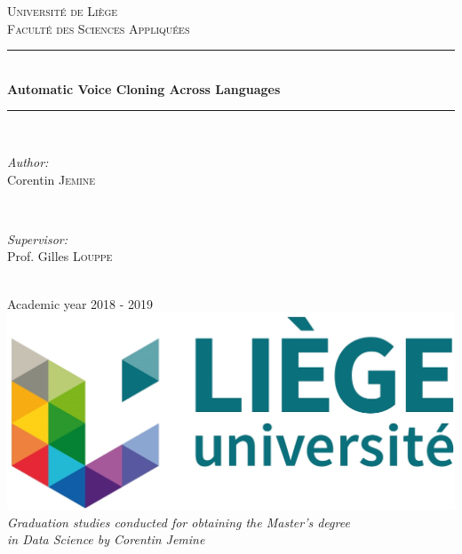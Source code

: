 \documentclass[a4paper, oneside]{article}
\begin{document}
\begin{titlepage}
	\newcommand{\HRule}{\rule{\linewidth}{0.5mm}}
	\center
	\textsc{\LARGE Université de Liège}\\[1cm]
	\textsc{\Large Faculté des Sciences Appliquées}\\[2cm]
		
	\HRule \\[0.5cm]
	{ \huge \bfseries Automatic Voice Cloning Across Languages}\\[0.2cm]
	\HRule \\[3cm]

	\begin{minipage}{0.4\textwidth}
		\begin{flushleft} \Large
			\emph{Author:}\\
			Corentin \textsc{Jemine}
		\end{flushleft}
	\end{minipage}
	~
	\begin{minipage}{0.4\textwidth}
		\begin{flushright} \Large
			\emph{Supervisor:} \\
			Prof. Gilles \textsc{Louppe}
		\end{flushright}
	\end{minipage}\\[4cm]
	
	{\LARGE Academic year 2018 - 2019}\\[2.5cm]
	
	\includegraphics{images/uliege_logo.jpg}\\[1.25cm]
	
	\textit{Graduation studies conducted for obtaining the Master's degree \\in Data Science by Corentin Jemine}
	
	\vfill
\end{titlepage}

\setcounter{page}{2}
\end{document}
